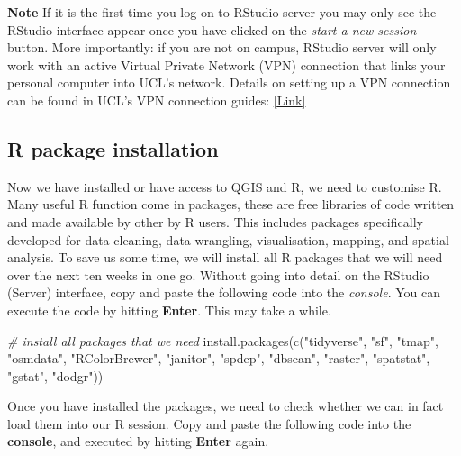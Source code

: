 \documentclass[
]{book}
\newenvironment{Shaded}{\begin{snugshade}}{\end{snugshade}}
\newcommand{\CommentTok}[1]{\textcolor[rgb]{0.56,0.35,0.01}{\textit{#1}}}
\newcommand{\FunctionTok}[1]{\textcolor[rgb]{0.00,0.00,0.00}{#1}}
\newcommand{\NormalTok}[1]{#1}
\newcommand{\StringTok}[1]{\textcolor[rgb]{0.31,0.60,0.02}{#1}}
\begin{document}
\textbf{Note}
If it is the first time you log on to RStudio server you may only see the RStudio interface appear once you have clicked on the \emph{start a new session} button. More importantly: if you are not on campus, RStudio server will only work with an active Virtual Private Network (VPN) connection that links your personal computer into UCL's network. Details on setting up a VPN connection can be found in UCL's VPN connection guides: \href{https://www.ucl.ac.uk/isd/services/get-connected/ucl-virtual-private-network-vpn}{{[}Link{]}}

\hypertarget{r-package-installation}{%
\subsection{R package installation}\label{r-package-installation}}

Now we have installed or have access to QGIS and R, we need to customise R. Many useful R function come in packages, these are free libraries of code written and made available by other by R users. This includes packages specifically developed for data cleaning, data wrangling, visualisation, mapping, and spatial analysis. To save us some time, we will install all R packages that we will need over the next ten weeks in one go. Without going into detail on the RStudio (Server) interface, copy and paste the following code into the \emph{console}. You can execute the code by hitting \textbf{Enter}. This may take a while.

\begin{Shaded}
\begin{Highlighting}[]
\CommentTok{\# install all packages that we need}
\FunctionTok{install.packages}\NormalTok{(}\FunctionTok{c}\NormalTok{(}\StringTok{"tidyverse"}\NormalTok{, }\StringTok{"sf"}\NormalTok{, }\StringTok{"tmap"}\NormalTok{, }\StringTok{"osmdata"}\NormalTok{, }\StringTok{"RColorBrewer"}\NormalTok{, }\StringTok{"janitor"}\NormalTok{,}
    \StringTok{"spdep"}\NormalTok{, }\StringTok{"dbscan"}\NormalTok{, }\StringTok{"raster"}\NormalTok{, }\StringTok{"spatstat"}\NormalTok{, }\StringTok{"gstat"}\NormalTok{, }\StringTok{"dodgr"}\NormalTok{))}
\end{Highlighting}
\end{Shaded}

Once you have installed the packages, we need to check whether we can in fact load them into our R session. Copy and paste the following code into the \textbf{console}, and executed by hitting \textbf{Enter} again.
\end{document}
